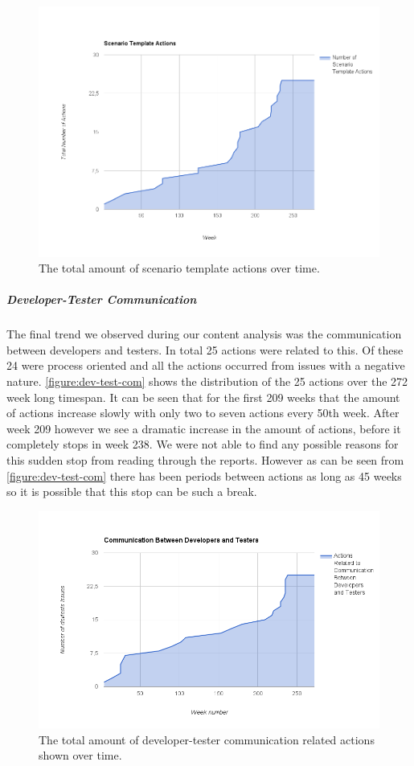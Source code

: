 \begin{figure}[!h]
	\centering
	\includegraphics[width=\textwidth, keepaspectratio]{figures/Scenario-tpl.png}
	\caption{The total amount of scenario template actions over time.}
	\label{figure:scenario-template}
\end{figure}

\subparagraph{Developer-Tester Communication}
The final trend we observed during our content analysis was the communication between developers and testers. In total 25 actions were related to this. Of these 24 were process oriented and all the actions occurred from issues with a negative nature. 
\autoref{figure:dev-test-com} shows the distribution of the 25 actions over the 272 week long timespan. It can be seen that for the first 209 weeks that the amount of actions increase slowly with only two to seven actions every 50th week. After week 209 however we see a dramatic increase in the amount of actions, before it completely stops in week 238. We were not able to find any possible reasons for this sudden stop from reading through the reports. However as can be seen from \autoref{figure:dev-test-com} there has been periods between actions as long as 45 weeks so it is possible that this stop can be such a break.  

\begin{figure}[!h]
	\centering
	\includegraphics[width=\textwidth, keepaspectratio]{figures/devtestcom.png}
	\caption{The total amount of developer-tester communication related actions shown over time.}
	\label{figure:dev-test-com}
\end{figure}

